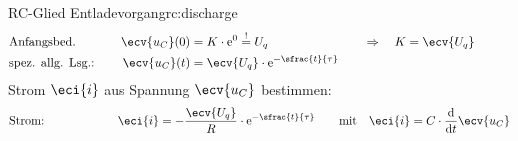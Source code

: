 {\begin{bsp}{RC-Glied Entladevorgang}{rc:discharge}
\begin{align*}
            &\text{Anfangsbed.}&&&
                \ecv{u_C}(0) &= K \cdot \mathrm{e}^{0} \overset{!}{=} U_q &&&&
                    \Rightarrow\quad K = \ecv{U_q}\\
            &\text{spez. allg. Lsg.:}&&&
                \ecv{u_C}(t) &= \ecv{U_q} \cdot  \mathrm{e}^{-\sfrac{t}{\tau}}
            \\[-15pt]&\hphantom{R1oooooooooooo}&&&\hphantom{L3ooo}&\hphantom{R3oooooooooooooooo}&&&&\hphantom{R5oooooooooooooooooooooo}\nonumber%
            \end{align*}
        Strom $\eci{i}$ aus Spannung $\ecv{u_C}$ bestimmen:%
        \begin{align*}%
            &\text{Strom:}&&&
                \eci{i} &= - \frac{\ecv{U_q}}{R} \cdot \mathrm{e}^{-\sfrac{t}{\tau}} &&&
                &\text{mit}\quad \eci{i} = C \cdot \frac{\mathrm{d}}{\mathrm{d}t} \ecv{u_C}
            \\[-15pt]&\hphantom{R1oooooooooooo}&&&\hphantom{L3ooo}&\hphantom{R3oooooooooooooooo}&&&&\hphantom{R5oooooooooooooooooooooo}\nonumber%
        \end{align*}
        \endgroup
    \end{bsp}
}%



